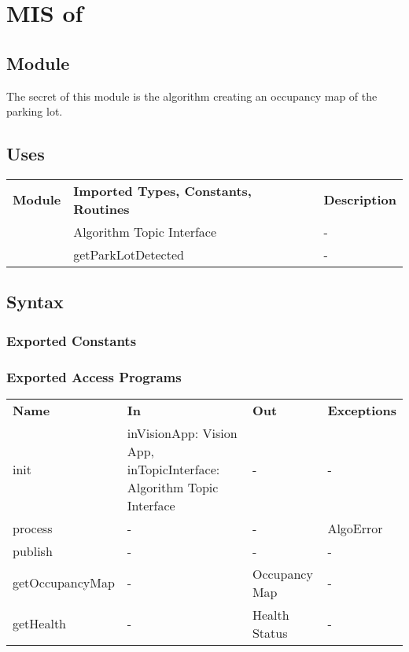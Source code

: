\documentclass[12pt, titlepage]{article}
\begin{document}
\section{MIS of } \label{MIS_MAPPER_APP} 
\subsection{Module}
The secret of this module is the algorithm creating an occupancy map of the parking lot.
\subsection{Uses}
\begin{center}
\begin{tabular}{p{2 cm} p{5cm} p{6.5cm} } 
\hline
\textbf{Module} & \textbf{Imported Types, Constants, Routines} & \textbf{Description} \\
\nameref{Algorithm Topic Interface} & Algorithm Topic Interface & - \\
\nameref{Vision App} & getParkLotDetected  & - \\
\hline
\hline
\end{tabular}
\end{center}
\subsection{Syntax}
\subsubsection{Exported Constants}
\subsubsection{Exported Access Programs}
\begin{center}
\begin{tabular}{p{3.5cm} p{2.5cm} p{2.5cm} p{5cm}}
\hline
\textbf{Name} & \textbf{In} & \textbf{Out} & \textbf{Exceptions} \\
init & inVisionApp: Vision App, inTopicInterface: Algorithm Topic Interface & - & - \\
process & -  & - & AlgoError \\
publish & - & - & - \\
getOccupancyMap & - & Occupancy Map & - \\
getHealth & - & Health Status & - \\
\hline
\hline
\end{tabular}
\end{center}
\end{document}

